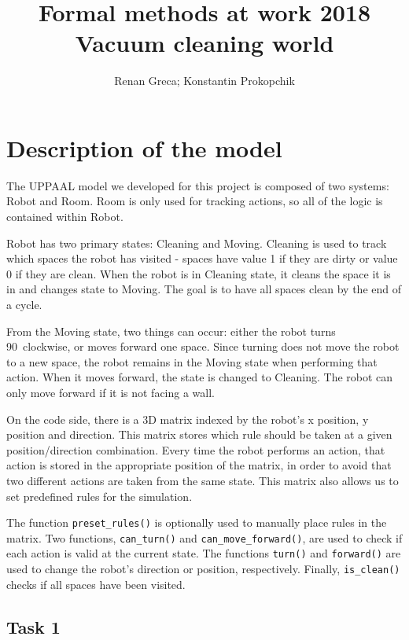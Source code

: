 \documentclass[11pt]{article}
\begin{document}
\title{Formal methods at work 2018\\Vacuum cleaning world}
\author{Renan Greca; Konstantin Prokopchik}

\maketitle

\section*{Description of the model}

The UPPAAL model we developed for this project is composed of two systems: Robot and Room.
Room is only used for tracking actions, so all of the logic is contained within Robot.

Robot has two primary states: Cleaning and Moving.
Cleaning is used to track which spaces the robot has visited - spaces have value 1 if they are dirty or value 0 if they are clean.
When the robot is in Cleaning state, it cleans the space it is in and changes state to Moving.
The goal is to have all spaces clean by the end of a cycle.

From the Moving state, two things can occur: either the robot turns 90\degree\ clockwise, or moves forward one space.
Since turning does not move the robot to a new space, the robot remains in the Moving state when performing that action. When it moves forward, the state is changed to Cleaning.
The robot can only move forward if it is not facing a wall.

On the code side, there is a 3D matrix indexed by the robot's x position, y position and direction. This matrix stores which rule should be taken at a given position/direction combination. Every time the robot performs an action, that action is stored in the appropriate position of the matrix, in order to avoid that two different actions are taken from the same state. This matrix also allows us to set predefined rules for the simulation.

The function \texttt{preset\_rules()} is optionally used to manually place rules in the matrix. 
Two functions, \texttt{can\_turn()} and \texttt{can\_move\_forward()}, are used to check if each action is valid at the current state. 
The functions \texttt{turn()} and \texttt{forward()} are used to change the robot's direction or position, respectively. 
Finally, \texttt{is\_clean()} checks if all spaces have been visited.

\subsection*{Task 1}
\end{document}
